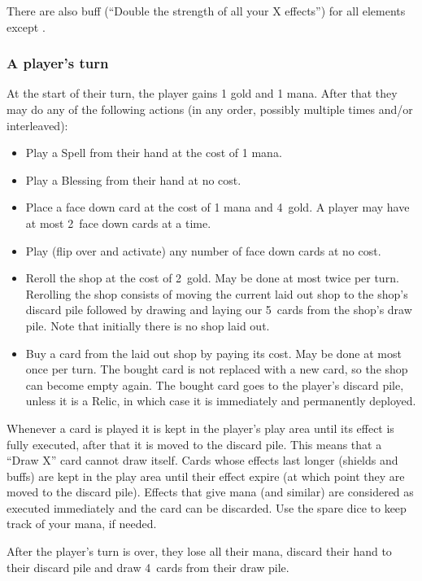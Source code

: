 \documentclass[dvipsnames,parskip,a4paper]{scrartcl}
\newcommand{\iconsize}{3.4mm}
\newcommand{\icondepth}{0.45mm}
\newcommand{\icon}[1]{\raisebox{-\icondepth}{\texttt{[image:  \#1 ]}}}
\newcommand{\chance}{\icon{icons/chance.png}}
\newcommand{\rerollcost}{2}
\newcommand{\facedowncost}{4}
\newcommand{\handsize}{4}
\newcommand{\dacedownsize}{2}
\newcommand{\shopsize}{5}
\begin{document}
There are also buff (``Double the strength of all your X effects'') for all elements except \chance.

\subsubsection*{A player's turn}

At the start of their turn, the player gains 1 gold and 1 mana. After that they may do any of the following actions (in any order, possibly multiple times and/or interleaved):

\begin{itemize}
\item Play a Spell from their hand at the cost of 1 mana.
\item Play a Blessing from their hand at no cost.
\item Place a face down card at the cost of 1 mana and \facedowncost \ gold. A player may have at most \dacedownsize \ face down cards at a time.
\item Play (flip over and activate) any number of face down cards at no cost.
\item Reroll the shop at the cost of \rerollcost \ gold. May be done at most twice per turn.
Rerolling the shop consists of moving the current laid out shop to the shop's discard pile followed by drawing and laying our \shopsize \ cards from the shop's draw pile. Note that initially there is no shop laid out.
\item Buy a card from the laid out shop by paying its cost. May be done at most once per turn.
The bought card is not replaced with a new card, so the shop can become empty again. The bought card goes to the player's discard pile, unless it is a Relic, in which case it is immediately and permanently deployed.
\end{itemize}

Whenever a card is played it is kept in the player's play area until its effect is fully executed, after that it is moved to the discard pile. This means that a ``Draw X'' card cannot draw itself. Cards whose effects last longer (shields and buffs) are kept in the play area until their effect expire (at which point they are moved to the discard pile). Effects that give mana (and similar) are considered as executed immediately and the card can be discarded. Use the spare dice to keep track of your mana, if needed.

After the player's turn is over, they lose all their mana, discard their hand to their discard pile and draw \handsize \ cards from their draw pile.
\end{document}
